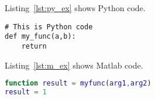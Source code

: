 \documentclass{CE295_HW_template}
\title{
\vspace{-0.5cm}
\textbf{\hmwkTitle}
\author{} %
\date{} %
\vspace{-1cm}
}
\begin{document}
\maketitle
\thispagestyle{fancy}


\begin{Problem}
\begin{Section}
Listing~\ref{lst:py_ex} shows Python code.

\begin{lstlisting}[caption={Python Example},label=lst:py_ex]
# This is Python code
def my_func(a,b):
    return
\end{lstlisting}
\end{Section}

\begin{Section}
Listing~\ref{lst:m_ex} shows Matlab code.
\begin{lstlisting}[language=Matlab,caption={Matlab Example},label=lst:m_ex]
% This is Matlab code
function result = myfunc(arg1,arg2)
result = 1
\end{lstlisting}

\lipsum[1]
\end{Section}
\end{Problem}


\begin{Problem}
\lipsum[2]

\end{Problem}
\end{document}
